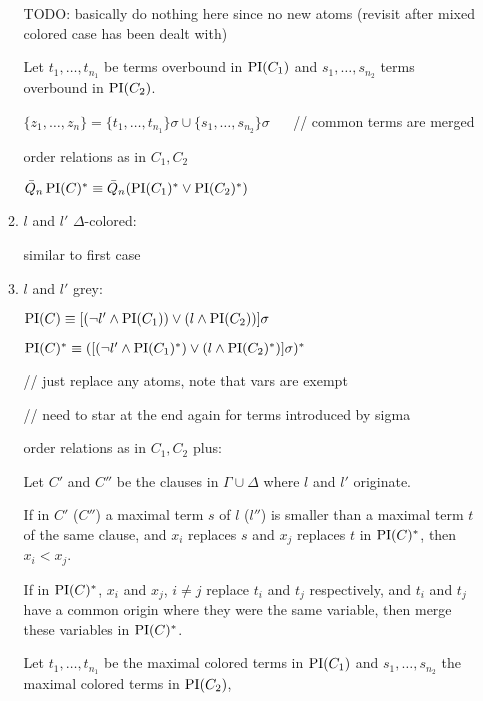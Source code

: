 \documentclass[,%
	paper=a4,%
	DIV14, 
	liststotoc,
	bibtotoc,
	draft=false,%
	numbers=noendperiod
]{scrartcl}
\begin{document}
\begin{defi}
\begin{itemize}
\begin{enumerate}
					TODO: basically do nothing here since no new atoms (revisit after mixed colored case has been dealt with)

					Let $t_1, \ldots, t_{n_1}$ be terms overbound in $\operatorname{PI}(C_1)$ and
					$s_1, \ldots, s_{n_2}$ terms overbound in $\operatorname{PI}(C_2)$.

					$\{ z_1, \ldots, z_n \} = \{t_1, \ldots, t_{n_1}\} \sigma \cup \{s_1, \ldots, s_{n_2}\} \sigma$ $\quad$ // common terms are merged

					order relations as in $C_1, C_2$

					$\bar Q_n \operatorname{PI}(C)^* \equiv \bar Q_n ( \operatorname{PI}(C_1)^* \lor \operatorname{PI}(C_2)^*) $

				\item $l$ and $l'$ $\Delta$-colored:

					similar to first case

				\item $l$ and $l'$ grey:

					{ \footnotesize \color{gray}

					$\operatorname{PI}(C) \equiv [(\lnot l' \land \operatorname{PI}(C_1)) \lor (l \land \operatorname{PI}(C_2)) ] \sigma $

					$\operatorname{PI}(C)^* \equiv ( [ (\lnot l' \land \operatorname{PI}(C_1)^*) \lor (l \land \operatorname{PI}(C_2)^*) ] \sigma ) ^* $
					
					// just replace any atoms, note that vars are exempt

					// need to star at the end again for terms introduced by sigma

					order relations as in $C_1, C_2$ plus:

					Let $C'$ and $C''$ be the clauses in $\Gamma \cup \Delta$ where $l$ and $l'$ originate.
					
					If in $C'$ ($C''$) a maximal term $s$ of $l$ ($l''$) is smaller than a maximal term $t$ of the same clause, and $x_i$ replaces $s$ and $x_j$ replaces $t$ in $\operatorname{PI}(C)^*$, then $x_i < x_j$.

					If in $\operatorname{PI}(C)^*$, $x_i$ and $x_j$, $i\neq j$ replace $t_i$ and $t_j$ respectively, and $t_i$ and $t_j$ have a common origin where they were the same variable, then merge these variables in $\operatorname{PI}(C)^*$.



						Let $t_1, \ldots, t_{n_1}$ be the maximal colored terms in $\operatorname{PI}(C_1)$
						and $s_1, \ldots, s_{n_2}$ the maximal colored terms in $\operatorname{PI}(C_2)$,

}
\end{enumerate}
\end{itemize}
\end{defi}
\end{document}
